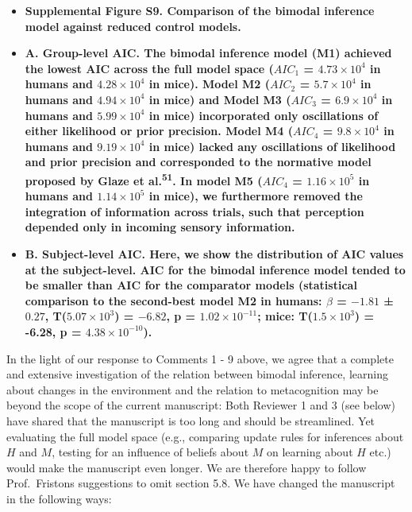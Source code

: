 \documentclass[
]{article}
\begin{document}
\begin{itemize}
\item
  \textbf{Supplemental Figure S9. Comparison of the bimodal inference
  model against reduced control models.}
\item
  \textbf{A. Group-level AIC. The bimodal inference model (M1) achieved
  the lowest AIC across the full model space (\(AIC_1\) =
  \ensuremath{4.73\times 10^{4}} in humans and
  \ensuremath{4.28\times 10^{4}} in mice). Model M2 (\(AIC_2\) =
  \(\ensuremath{5.7\times 10^{4}}\) in humans and
  \(\ensuremath{4.94\times 10^{4}}\) in mice) and Model M3 (\(AIC_3\) =
  \(\ensuremath{6.9\times 10^{4}}\) in humans and
  \(\ensuremath{5.99\times 10^{4}}\) in mice) incorporated only
  oscillations of either likelihood or prior precision. Model M4
  (\(AIC_4\) = \(\ensuremath{9.8\times 10^{4}}\) in humans and
  \(\ensuremath{9.19\times 10^{4}}\) in mice) lacked any oscillations of
  likelihood and prior precision and corresponded to the normative model
  proposed by Glaze et al.\textsuperscript{51}. In model M5 (\(AIC_4\) =
  \(\ensuremath{1.16\times 10^{5}}\) in humans and
  \(\ensuremath{1.14\times 10^{5}}\) in mice), we furthermore removed
  the integration of information across trials, such that perception
  depended only in incoming sensory information.}
\item
  \textbf{B. Subject-level AIC. Here, we show the distribution of AIC
  values at the subject-level. AIC for the bimodal inference model
  tended to be smaller than AIC for the comparator models (statistical
  comparison to the second-best model M2 in humans: \(\beta\) =
  \(-1.81\) ± \(0.27\), T(\(\ensuremath{5.07\times 10^{3}}\)) =
  \(-6.82\), p = \(\ensuremath{1.02\times 10^{-11}}\); mice:
  T(\ensuremath{1.5\times 10^{3}}) = -6.28, p =
  \(\ensuremath{4.38\times 10^{-10}}\)).}
\end{itemize}

In the light of our response to Comments 1 - 9 above, we agree that a
complete and extensive investigation of the relation between bimodal
inference, learning about changes in the environment and the relation to
metacognition may be beyond the scope of the current manuscript: Both
Reviewer 1 and 3 (see below) have shared that the manuscript is too long
and should be streamlined. Yet evaluating the full model space (e.g.,
comparing update rules for inferences about \(H\) and \(M\), testing for
an influence of beliefs about \(M\) on learning about \(H\) etc.) would
make the manuscript even longer. We are therefore happy to follow
Prof.~Fristons suggestions to omit section 5.8. We have changed the
manuscript in the following ways:
\end{document}
